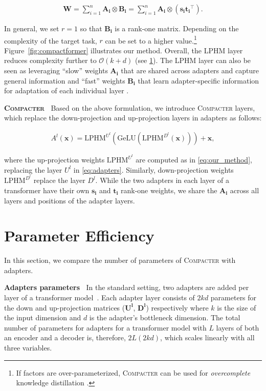 \begin{align}
\bm{W} = \sum_{i=1}^n \bm{A_i} \otimes \bm{B_i} = \sum_{i=1}^n \bm{A_i} \otimes (\bm{s_i}\bm{t_i}^\top).
\label{eq:our_method}
\end{align}

 
In general, we set $r=1$ so that $\bm{B_i}$ is a rank-one matrix. Depending on the complexity of the target task, $r$ can be set to a higher value.\footnote{If factors are over-parameterized, \textsc{Compacter} can be used for \emph{overcomplete} knowledge distillation \citep{arora2018optimization}.} Figure~\ref{fig:compactformer} illustrates our method. Overall, the LPHM layer reduces complexity further to $\mathcal{O}(k+d)$ (see \textsection \ref{sec:parameter_efficiency}).
The LPHM layer can also be seen as leveraging ``slow'' weights $\bm{A_i}$ that are shared across adapters and capture general information and ``fast'' weights $\bm{B_i}$ that learn adapter-specific information for adaptation of each individual layer \citep{Wen2020batchensemble}.

 \textbf{\textsc{Compacter}} $\:$ \label{sec:phm-adapters}
Based on the above formulation, we introduce \textsc{Compacter} layers, which replace the down-projection and up-projection layers in adapters as follows:

\begin{align}
A^l(\bm{x}) =\text{LPHM}^{U^l}(\text{GeLU}(\text{LPHM}^{D^l}(\bm{x}))) + \bm{x}, \nonumber

\end{align}

where the up-projection weights $\text{LPHM}^{U^l}$ are computed as in \eqref{eq:our_method}, replacing the layer $U^l$ in \eqref{eq:adapters}. Similarly, down-projection weights $\text{LPHM}^{D^l}$ replace the layer $D^l$. While the two adapters in each layer of a transformer have their own $\bm{s_i}$ and $\bm{t_i}$ rank-one weights, we share the $\bm{A_i}$ across all layers and positions of the adapter layers.

\section{Parameter Efficiency} \label{sec:parameter_efficiency}
In this section, we compare the number of parameters of \textsc{Compacter} with adapters.

 \textbf{Adapters parameters} $\:$ In the standard setting, two adapters are added per layer of a transformer model~\citep{houlsby2019parameter}. Each adapter layer consists of $2kd$ parameters for the down and up-projection matrices ($\bm{U^l}$, $\bm{D^l}$) respectively where $k$ is the size of the input dimension and $d$ is the adapter's bottleneck dimension. The total number of parameters for adapters for a transformer model with $L$ layers of both an encoder and a decoder is, therefore, $2L(2kd)$, which scales linearly with all three variables.

